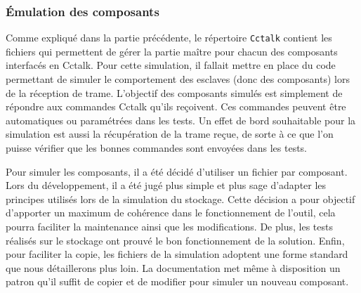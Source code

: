 \documentclass[a4paper]{article}
\begin{document}
\subsubsection{Émulation des composants}

Comme expliqué dans la partie précédente, le répertoire \verb|Cctalk| contient
les fichiers qui permettent de gérer la partie maître pour chacun des
composants interfacés en Cctalk. Pour cette simulation, il fallait mettre en
place du code permettant de simuler le comportement des esclaves (donc des
composants) lors de la réception de trame. L'objectif des composants simulés est
simplement de répondre aux commandes Cctalk qu'ils reçoivent. Ces commandes
peuvent être automatiques ou paramétrées dans les tests. Un effet de bord
souhaitable pour la simulation est aussi la récupération de la trame reçue, de
sorte à ce que l'on puisse vérifier que les bonnes commandes sont envoyées dans
les tests.

Pour simuler les composants, il a été décidé d'utiliser un fichier par
composant. Lors du développement, il a été jugé plus simple et plus sage
d'adapter les principes utilisés lors de la simulation du stockage. Cette
décision a pour objectif d'apporter un maximum de cohérence dans le
fonctionnement de l'outil, cela pourra faciliter la maintenance ainsi que les
modifications. De plus, les tests réalisés sur le stockage ont prouvé le bon
fonctionnement de la solution. Enfin, pour faciliter la copie, les fichiers de
la simulation adoptent une forme standard que nous détaillerons plus loin. La
documentation met même à disposition un patron qu'il suffit de copier et de
modifier pour simuler un nouveau composant.
\end{document}
